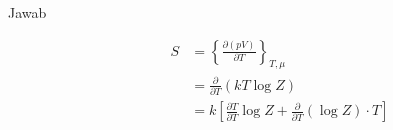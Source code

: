 \documentclass[a4paper , 12 pt]{article}
\begin{document}
\begin{enumerate}
	\begin{description}
	\item[Jawab]
	\begin{align}
	S & = \left\lbrace \frac{\partial (pV)}{\partial T} \right \rbrace_{T, \mu} \nonumber  \\
	& = \frac{\partial}{\partial T} (k T \log Z) \nonumber \\
	& = k \left[ \frac{\partial T}{\partial T} \log Z + \frac{\partial}{\partial T} (\log Z) \cdot T  \right ]  \tag{QED}
	\end{align} 
	\end{description}
	
\end{enumerate}
\end{document}
